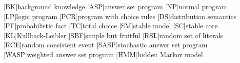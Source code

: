 \newcommand{\class}[1]{\ensuremath{[{#1}]_{\sim}}}
\newcommand{\tcgen}[1]{\MODELset\at{#1}}
\newcommand{\condsymb}[2]{\ensuremath{p_{#1|#2}}}
\newcommand{\lpmln}{\texttt{LP\textsuperscript{MLN}}}
\newcommand{\emptyevent}{\ensuremath{\lambda}}
\newcommand{\powerset}[1]{\ensuremath{\mathbb{P}\at{#1}}}
%
%
[BK]{background knowledge}
[ASP]{answer set program}
[NP]{normal program}
[LP]{logic program}
[PCR]{program with choice rules}
[DS]{distribution semantics}
[PF]{probabilistic fact}
[TC]{total choice}
[SM]{stable model}
[SC]{stable core}
[KL]{Kullback-Leibler}
[SBF]{simple but fruitful}
[RSL]{random set of literals}
[RCE]{random consistent event}
[SASP]{stochastic answer set program}
[WASP]{weighted answer set program}
[HMM]{hidden Markov model}
%
%
\newcommand{\sbf}{\ensuremath{\mathrm{sbf}}}
%
%
\newcommand{\LOOK}{\ensuremath{\blacksquare}}
\newcommand{\delete}[1]{\sout{#1}}
\newcommand{\sidenote}[1]{\stepcounter{revcounter}{\color{red!50!black}\(\vert^{\arabic{revcounter}}\)}\marginpar{{\color{red!50!black}\(^{\arabic{revcounter}}\vert\)}\footnotesize #1}}
\newcommand{\replace}[2]{\delete{#1}\sidenote{#2}}
\newcommand{\bruno}{\color{red!60!black}}
\newcommand{\dietmar}[1]{{\color{brown!40!black}#1}}


\newcommand{\selfnote}[1]{\todo[backgroundcolor=green!20]{{\footnotesize #1}}}
\newcommand{\spa}[1]{{\todo[size=footnotesize,color=teal!20]{\textbf{SPA:} #1}}}
\newcommand{\dsnote}[1]{{\todo[size=footnotesize,color=teal!20]{\textbf{DS:} #1}}}
\newcommand{\franc}[1]{{\todo[size=footnotesize,color=green!30]{\textbf{FC:} #1}}}
\newcommand{\bdnote}[1]{{\todo[size=footnotesize,color=red!60]{\textbf{BD:} #1}}}
